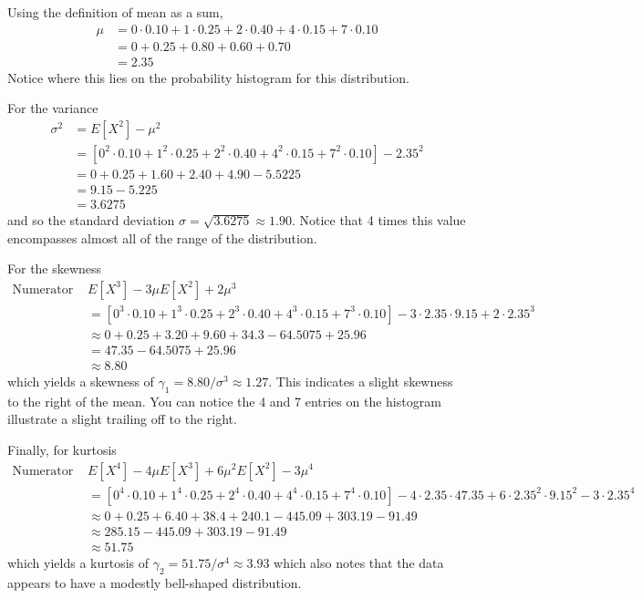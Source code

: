 \documentclass[10pt,]{book}
\theoremstyle{plain}
\theoremstyle{definition}
\theoremstyle{definition}
\theoremstyle{definition}
\numberwithin{equation}{section}
\begin{document}
	Using the definition of mean as a sum,
	\begin{align*}
\mu & = 0 \cdot 0.10 + 1 \cdot 0.25 + 2 \cdot 0.40 + 4 \cdot 0.15 + 7 \cdot 0.10\\
 & = 0 + 0.25 + 0.80 + 0.60 + 0.70\\
 & = 2.35
\end{align*}
	Notice where this lies on the probability histogram for this distribution.
\par
For the variance
	\begin{align*}
\sigma^2 & = E[X^2] - \mu^2\\
 & = \left [ 0^2 \cdot 0.10 + 1^2 \cdot 0.25 + 2^2 \cdot 0.40 + 4^2 \cdot 0.15 + 7^2 \cdot 0.10 \right ] - 2.35^2\\
 & = 0 + 0.25 + 1.60 + 2.40 + 4.90 - 5.5225\\
 & = 9.15 - 5.225\\
 & = 3.6275 
\end{align*}	
	and so the standard deviation \(\sigma = \sqrt{3.6275} \approx 1.90\). Notice that 4 times this value encompasses almost all of the range of the distribution.
\par
For the skewness
	\begin{align*}
 \text{Numerator = } & E[X^3] - 3 \mu E[X^2] + 2\mu^3\\
 & = \left [ 0^3 \cdot 0.10 + 1^3 \cdot 0.25 + 2^3 \cdot 0.40 + 4^3 \cdot 0.15 + 7^3 \cdot 0.10 \right ] - 3 \cdot 2.35 \cdot 9.15 + 2 \cdot 2.35^3\\
 & \approx 0 + 0.25 + 3.20 + 9.60 + 34.3 - 64.5075 + 25.96\\
 & = 47.35 - 64.5075 + 25.96\\
 & \approx 8.80
\end{align*}
	which yields a skewness of \(\gamma_1 = 8.80 / \sigma^3 \approx 1.27 \). This indicates a slight skewness to the right of the mean. You can notice the 4 and 7 entries on the histogram illustrate a slight trailing off to the right.
\par
Finally, for kurtosis
	\begin{align*}
 \text{Numerator = } & E[X^4] - 4 \mu E[X^3] + 6 \mu^2 E[X^2] - 3\mu^4\\
 & = \left [ 0^4 \cdot 0.10 + 1^4 \cdot 0.25 + 2^4 \cdot 0.40 + 4^4 \cdot 0.15 + 7^4 \cdot 0.10 \right ] - 4 \cdot 2.35 \cdot 47.35 + 6 \cdot 2.35^2 \cdot 9.15^2 - 3 \cdot 2.35^4\\
 & \approx 0 + 0.25 + 6.40 + 38.4 + 240.1 - 445.09 + 303.19 - 91.49\\
 & \approx 285.15 - 445.09 + 303.19 - 91.49\\
 & \approx 51.75
\end{align*}
	which yields a kurtosis of \(\gamma_2 = 51.75 / \sigma^4 \approx 3.93\) which also notes that the data appears to have a modestly bell-shaped distribution.
\par
\end{document}
